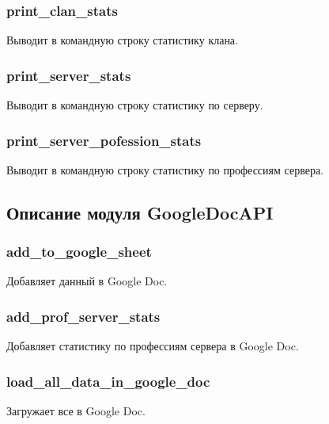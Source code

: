 \newpage

\subsubsection{print\_clan\_stats}
Выводит в командную строку статистику клана.

\parindent=1cm

\subsubsection{print\_server\_stats}
Выводит в командную строку статистику по серверу.

\parindent=1cm

\newpage

\subsubsection{print\_server\_pofession\_stats}
Выводит в командную строку статистику по профессиям сервера.

\parindent=1cm

\newpage

\subsection{Описание модуля GoogleDocAPI}

\subsubsection{add\_to\_google\_sheet}
Добавляет данный в Google Doc.

\parindent=1cm

\subsubsection{add\_prof\_server\_stats}
Добавляет статистику по профессиям сервера в Google Doc.

\parindent=1cm

\subsubsection{load\_all\_data\_in\_google\_doc}
Загружает все в Google Doc.

\parindent=1cm

